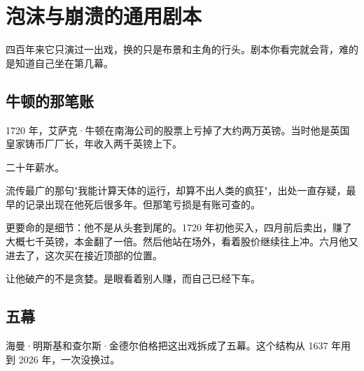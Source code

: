 \chapter{泡沫与崩溃的通用剧本}

\begin{ledetext}
四百年来它只演过一出戏，换的只是布景和主角的行头。剧本你看完就会背，难的是知道自己坐在第几幕。
\end{ledetext}

\section{牛顿的那笔账}

1720 年，艾萨克·牛顿在南海公司的股票上亏掉了大约两万英镑。当时他是英国皇家铸币厂厂长，年收入两千英镑上下。

二十年薪水。

流传最广的那句"我能计算天体的运行，却算不出人类的疯狂"，出处一直存疑，最早的记录出现在他死后很多年。但那笔亏损是有账可查的。

更要命的是细节：他不是从头套到尾的。1720 年初他买入，四月前后卖出，赚了大概七千英镑，本金翻了一倍。然后他站在场外，看着股价继续往上冲。六月他又进去了，这次买在接近顶部的位置。

让他破产的不是贪婪。是眼看着别人赚，而自己已经下车。

\section{五幕}

海曼·明斯基和查尔斯·金德尔伯格把这出戏拆成了五幕。这个结构从 1637 年用到 2026 年，一次没换过。

\begin{flowlist}
\end{flowlist}

